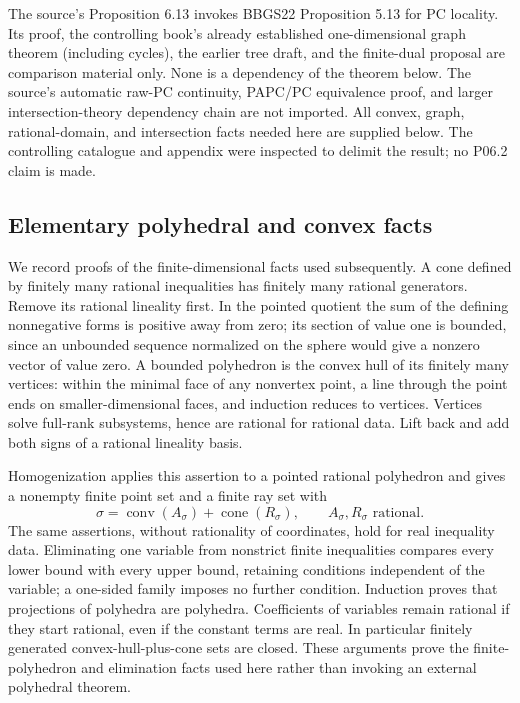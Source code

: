 \documentclass[
  11pt,
]{article}
\begin{document}
The source's Proposition 6.13 invokes BBGS22 Proposition 5.13 for PC
locality. Its proof, the controlling book's already established
one-dimensional graph theorem (including cycles), the earlier tree
draft, and the finite-dual proposal are comparison material only. None
is a dependency of the theorem below. The source's automatic raw-PC
continuity, PAPC/PC equivalence proof, and larger intersection-theory
dependency chain are not imported. All convex, graph, rational-domain,
and intersection facts needed here are supplied below. The controlling
catalogue and appendix were inspected to delimit the result; no P06.2
claim is made.

\subsection{Elementary polyhedral and convex
facts}\label{elementary-polyhedral-and-convex-facts}

We record proofs of the finite-dimensional facts used subsequently. A
cone defined by finitely many rational inequalities has finitely many
rational generators. Remove its rational lineality first. In the pointed
quotient the sum of the defining nonnegative forms is positive away from
zero; its section of value one is bounded, since an unbounded sequence
normalized on the sphere would give a nonzero vector of value zero. A
bounded polyhedron is the convex hull of its finitely many vertices:
within the minimal face of any nonvertex point, a line through the point
ends on smaller-dimensional faces, and induction reduces to vertices.
Vertices solve full-rank subsystems, hence are rational for rational
data. Lift back and add both signs of a rational lineality basis.

Homogenization applies this assertion to a pointed rational polyhedron
and gives a nonempty finite point set and a finite ray set with \[
 \sigma=\operatorname{conv}(A_\sigma)+\operatorname{cone}(R_\sigma),
                    \qquad A_\sigma,R_\sigma\text{ rational}.       \tag{4}
\] The same assertions, without rationality of coordinates, hold for
real inequality data. Eliminating one variable from nonstrict finite
inequalities compares every lower bound with every upper bound,
retaining conditions independent of the variable; a one-sided family
imposes no further condition. Induction proves that projections of
polyhedra are polyhedra. Coefficients of variables remain rational if
they start rational, even if the constant terms are real. In particular
finitely generated convex-hull-plus-cone sets are closed. These
arguments prove the finite-polyhedron and elimination facts used here
rather than invoking an external polyhedral theorem.
\end{document}
